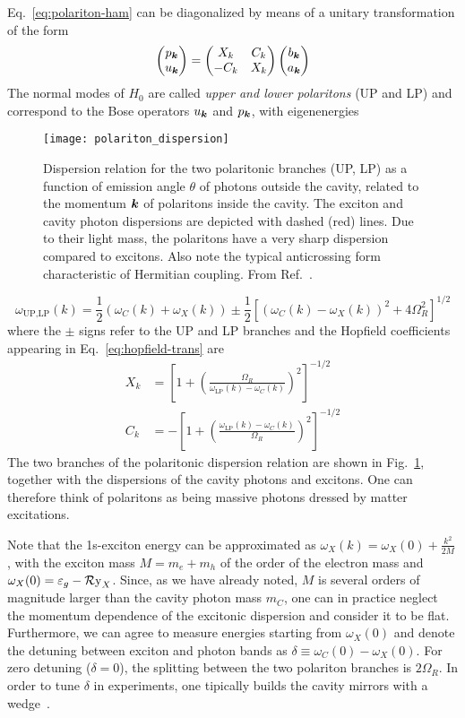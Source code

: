 Eq.~\eqref{eq:polariton-ham} can be diagonalized by means of a unitary
transformation of the form~\cite{Hopfield1958}
%
\begin{equation}\label{eq:hopfield-trans}
  \begin{pmatrix} p_{\bm{k}}\\ u_{\bm{k}} \end{pmatrix} = \begin{pmatrix} X_k & C_k\\ -C_k & X_k \end{pmatrix} \begin{pmatrix} b_{\bm{k}}\\ a_{\bm{k}} \end{pmatrix}
\end{equation}
% 
The normal modes of $H_0$ are called \textit{upper and lower
  polaritons} (UP and LP) and correspond to the Bose operators
$u_{\bm{k}}$ and $p_{\bm{k}}$, with eigenenergies
%
\begin{figure}[tb]\centering
  \texttt{[image: polariton\_dispersion]}
  \caption{
    Dispersion relation for the two polaritonic branches (UP, LP) as a function of emission angle $\theta$ of photons outside the cavity, related to the momentum $\bm{k}$ of polaritons inside the cavity. The exciton and cavity photon dispersions are depicted with dashed (red) lines. Due to their light mass, the polaritons have a very sharp dispersion  compared to excitons. Also note the typical anticrossing form characteristic of Hermitian coupling.
From Ref.~\cite{Keeling_2007}.
}\label{fig:polariton-dispersion}
\end{figure}
% 
\begin{equation}\label{eq:polariton-dispersion}
  \omega_{\text{UP,LP}}(k) = \frac{1}{2}\left(\omega_C(k) + \omega_X(k)\right) \pm \frac{1}{2}\left[\left(\omega_C(k) - \omega_X(k)\right)^2 + 4 \Omega_R^2\right]^{1/2}
\end{equation}
% 
where the $\pm$ signs refer to the UP and LP branches and the Hopfield
coefficients appearing in Eq.~\eqref{eq:hopfield-trans} are
\begin{align}
  X_k & =\left[1 + \left(\frac{\Omega_R}{\omega_{\text{LP}}(k) - \omega_C(k)}\right)^2\right]^{-1/2}\label{eq:hopfield-X}\\
  C_k & =-\left[1 + \left(\frac{\omega_{\text{LP}}(k) - \omega_C(k)}{\Omega_R}\right)^2\right]^{-1/2}
\end{align}
The two branches of the polaritonic dispersion relation are shown in
Fig.~\ref{fig:polariton-dispersion}, together with the dispersions of
the cavity photons and excitons. One can therefore think of polaritons
as being massive photons dressed by matter excitations.

Note that the 1s-exciton energy can be approximated as
$\omega_X(k) = \omega_X(0) + \frac{k^2}{2M}$, with the exciton mass
$M = m_e + m_h$ of the order of the electron mass and
$\omega_X(0) = \varepsilon_g - \operatorname{\mathcal{R}y}_X$. Since, as we have already
noted, $M$ is several orders of magnitude larger than the cavity
photon mass $m_{C}$, one can in practice neglect the momentum
dependence of the excitonic dispersion and consider it to be
flat. Furthermore, we can agree to measure energies starting from
$\omega_X(0)$ and denote the detuning between exciton and photon bands
as $\delta \equiv \omega_C(0) - \omega_X(0)$. For zero detuning
($\delta = 0$), the splitting between the two polariton branches is
$2\Omega_R$. In order to tune $\delta$ in experiments, one tipically
builds the cavity mirrors with a wedge~\cite{Weisbuch1992}.



